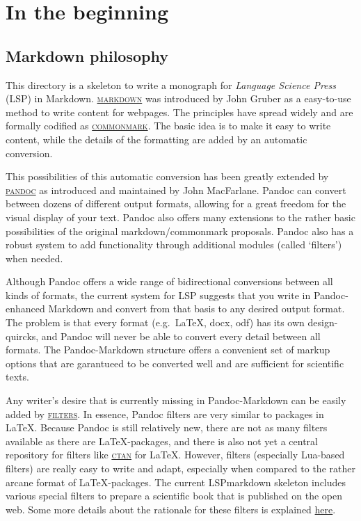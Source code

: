 \hypertarget{in-the-beginning}{%
\chapter{In the beginning}\label{in-the-beginning}}

\hypertarget{markdown-philosophy}{%
\section{Markdown philosophy}\label{markdown-philosophy}}

This\paragraphnumber{[1.1]} directory is a skeleton to write a monograph
for \emph{Language Science Press} (LSP) in Markdown.
\href{https://daringfireball.net/projects/markdown/}{\textsc{markdown}}
was introduced by John Gruber as a easy-to-use method to write content
for webpages. The principles have spread widely and are formally
codified as \href{https://commonmark.org}{\textsc{commonmark}}. The
basic idea is to make it easy to write content, while the details of the
formatting are added by an automatic conversion.

This\paragraphnumber{[1.2]} possibilities of this automatic conversion
has been greatly extended by \href{https://pandoc.org}{\textsc{pandoc}}
as introduced and maintained by John MacFarlane. Pandoc can convert
between dozens of different output formats, allowing for a great freedom
for the visual display of your text. Pandoc also offers many extensions
to the rather basic possibilities of the original markdown/commonmark
proposals. Pandoc also has a robust system to add functionality through
additional modules (called `filters') when needed.

Although\paragraphnumber{[1.3]} Pandoc offers a wide range of
bidirectional conversions between all kinds of formats, the current
system for LSP suggests that you write in Pandoc-enhanced Markdown and
convert from that basis to any desired output format. The problem is
that every format (e.g.~LaTeX, docx, odf) has its own design-quircks,
and Pandoc will never be able to convert every detail between all
formats. The Pandoc-Markdown structure offers a convenient set of markup
options that are garantueed to be converted well and are sufficient for
scientific texts.

Any\paragraphnumber{[1.4]} writer's desire that is currently missing in
Pandoc-Markdown can be easily added by
\href{https://pandoc.org/lua-filters.html}{\textsc{filters}}. In
essence, Pandoc filters are very similar to packages in LaTeX. Because
Pandoc is still relatively new, there are not as many filters available
as there are LaTeX-packages, and there is also not yet a central
repository for filters like \href{https://ctan.org}{\textsc{ctan}} for
LaTeX. However, filters (especially Lua-based filters) are really easy
to write and adapt, especially when compared to the rather arcane format
of LaTeX-packages. The current LSPmarkdown skeleton includes various
special filters to prepare a scientific book that is published on the
open web. Some more details about the rationale for these filters is
explained \href{https://cysouw.github.io/openwebpublishing/}{here}.

